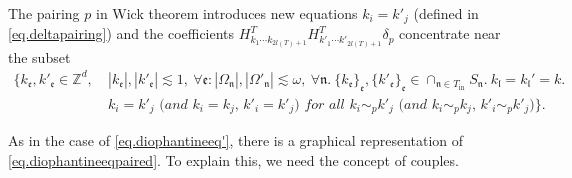  The pairing $p$ in Wick theorem introduces new equations $k_{i}=k'_{j}$ (defined in \eqref{eq.deltapairing}) and the coefficients $H^T_{k_1\cdots k_{2l(T)+1}} H^{T}_{k'_1\cdots k'_{2l(T)+1}} \delta_{p}$ concentrate near the subset 
 \begin{equation}\label{eq.diophantineeqpaired}
 \begin{split}
  \{k_{\mathfrak{e}}, k'_{\mathfrak{e}}\in \mathbb{Z}^d,\ &|k_{\mathfrak{e}}|, |k'_{\mathfrak{e}}|\lesssim 1,\ \forall \mathfrak{e}: |\Omega_{\mathfrak{n}}|,|\Omega'_{\mathfrak{n}}|\lesssim \omega,\ \forall \mathfrak{n}. \ \{k_{\mathfrak{e}}\}_{\mathfrak{e}}, \{k'_{\mathfrak{e}}\}_{\mathfrak{e}}\in \cap_{\mathfrak{n}\in T_{\text{in}}} S_{\mathfrak{n}}.\ k_{\mathfrak{l}}=k_{\mathfrak{l}}'=k. \\
  &\textit{$k_{i}=k'_{j}$ (and $k_{i}=k_{j}$, $k'_{i}=k'_{j}$) for all $k_{i}\sim_{p}k'_{j}$ (and $k_{i}\sim_{p}k_{j}$, $k'_{i}\sim_{p}k'_{j}$)}\}.
 \end{split}
 \end{equation}
 
 As in the case of \eqref{eq.diophantineeq'}, there is a graphical representation of \eqref{eq.diophantineeqpaired}. To explain this, we need the concept of couples.
 
 
